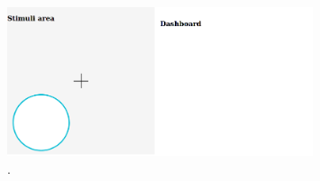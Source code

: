 \begin{figure}
\begin{centering}
% 
\includegraphics[width=0.8\textwidth]{Cap4/Figures/stimuli_delivery_areas.png}
\par\end{centering}
\caption[]{.}
\label{fig:stimuli_delivery_interface}
\end{figure}